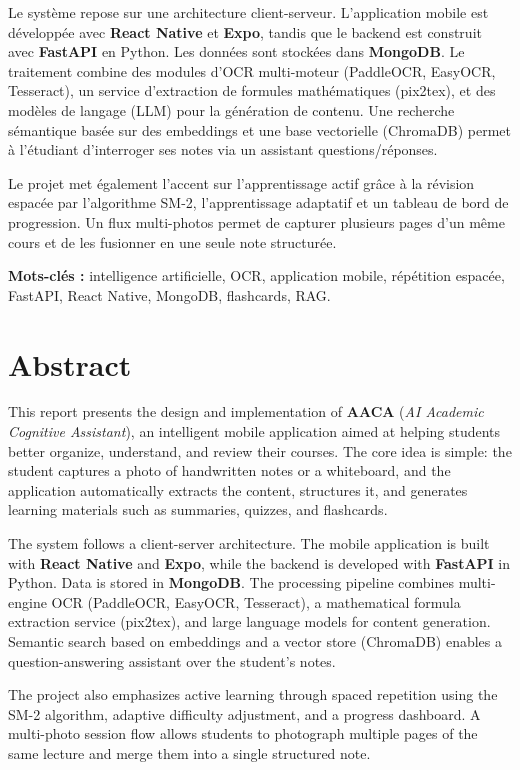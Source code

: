\documentclass[12pt,a4paper]{report}
\begin{document}
Le système repose sur une architecture client-serveur. L'application mobile est développée avec \textbf{React Native} et \textbf{Expo}, tandis que le backend est construit avec \textbf{FastAPI} en Python. Les données sont stockées dans \textbf{MongoDB}. Le traitement combine des modules d'OCR multi-moteur (PaddleOCR, EasyOCR, Tesseract), un service d'extraction de formules mathématiques (pix2tex), et des modèles de langage (LLM) pour la génération de contenu. Une recherche sémantique basée sur des embeddings et une base vectorielle (ChromaDB) permet à l'étudiant d'interroger ses notes via un assistant questions/réponses.

Le projet met également l'accent sur l'apprentissage actif grâce à la révision espacée par l'algorithme SM-2, l'apprentissage adaptatif et un tableau de bord de progression. Un flux multi-photos permet de capturer plusieurs pages d'un même cours et de les fusionner en une seule note structurée.

\textbf{Mots-clés :} intelligence artificielle, OCR, application mobile, répétition espacée, FastAPI, React Native, MongoDB, flashcards, RAG.

\chapter*{Abstract}

This report presents the design and implementation of \textbf{AACA} (\textit{AI Academic Cognitive Assistant}), an intelligent mobile application aimed at helping students better organize, understand, and review their courses. The core idea is simple: the student captures a photo of handwritten notes or a whiteboard, and the application automatically extracts the content, structures it, and generates learning materials such as summaries, quizzes, and flashcards.

The system follows a client-server architecture. The mobile application is built with \textbf{React Native} and \textbf{Expo}, while the backend is developed with \textbf{FastAPI} in Python. Data is stored in \textbf{MongoDB}. The processing pipeline combines multi-engine OCR (PaddleOCR, EasyOCR, Tesseract), a mathematical formula extraction service (pix2tex), and large language models for content generation. Semantic search based on embeddings and a vector store (ChromaDB) enables a question-answering assistant over the student's notes.

The project also emphasizes active learning through spaced repetition using the SM-2 algorithm, adaptive difficulty adjustment, and a progress dashboard. A multi-photo session flow allows students to photograph multiple pages of the same lecture and merge them into a single structured note.
\end{document}
